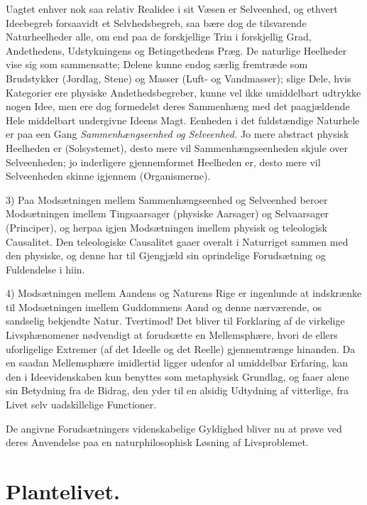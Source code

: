 \documentclass[11pt]{book}
\newcommand{\opage}[1]{\marginnote{\footnotesize\textit{[#1]}}}
\begin{document}
\opage{265} \setcounter{footnote}{0}%
Uagtet enhver nok saa relativ Realidee i sit Væsen er Selveenhed,
og ethvert Ideebegreb forsaavidt et Selvhedsbegreb, saa bære dog de
tilsvarende Naturheelheder alle, om end paa de forskjellige Trin i
forskjellig Grad, Andethedens, Udstykningens og Betingethedens Præg.
De naturlige Heelheder vise sig som sammensatte; Delene kunne endog
særlig fremtræde som Brudstykker (Jordlag, Stene) og Masser
(Luft- og Vandmasser); slige Dele, hvis Kategorier ere physiske
Andethedsbegreber, kunne vel ikke umiddelbart udtrykke nogen Idee,
men ere dog formedelst deres Sammenhæng med det paagjældende Hele
middelbart undergivne Ideens Magt. Eenheden i det fuldstændige
Naturhele er paa een Gang \emph{Sammenhængseenhed og Selveenhed.}
Jo mere abstract physisk Heelheden er (Solsystemet), desto mere vil
Sammenhængseenheden skjule over Selveenheden; jo inderligere
gjennemformet Heelheden er, desto mere vil Selveenheden skinne
igjennem (Organismerne).

3) Paa Modsætningen mellem Sammenhængseenhed og Selveenhed
beroer Modsætningen imellem Tingsaarsager (physiske Aarsager) og
Selvaarsager (Principer), og herpaa igjen Modsætningen imellem
physisk og teleologisk Causalitet. Den teleologiske Causalitet gaaer
overalt i Naturriget sammen med den physiske, og denne har til
Gjengjæld sin oprindelige Forudsætning og Fuldendelse i hiin.

4) Modsætningen mellem Aandens og Naturens Rige er ingenlunde
at indskrænke til Modsætningen imellem Guddommens Aand og denne
nærværende, os sandselig bekjendte Natur. Tvertimod! Det bliver til
Forklaring af de virkelige Livsphænomener nødvendigt at forudsætte
en Mellemsphære, hvori de ellers uforligelige Extremer (af det
Ideelle og det Reelle) gjennemtrænge hinanden. Da en saadan
Mellemsphære imidlertid ligger udenfor al umiddelbar Erfaring, kan
den i Ideevidenskaben kun benyttes som metaphysisk Grundlag, og faaer
alene sin Betydning fra de Bidrag, den yder til en alsidig Udtydning
af vitterlige, fra Livet selv uadskillelige Functioner.

\opage{266} \setcounter{footnote}{0}%
De angivne Forudsætningers videnskabelige Gyldighed bliver nu at
prøve ved deres Anvendelse paa en naturphilosophisk Løsning af
Livsproblemet.

\chapter*{Plantelivet.}
\end{document}
